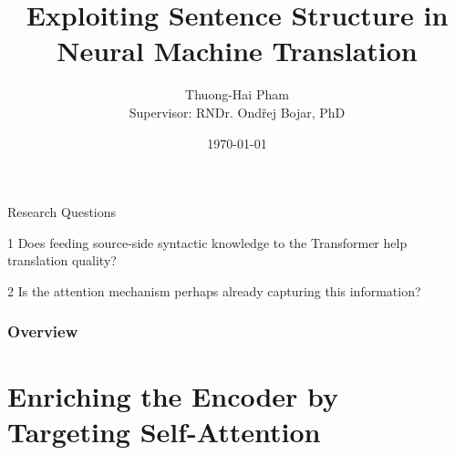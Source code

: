 \documentclass{beamer}
\title[Exploiting Sentence Structure in NMT]{Exploiting Sentence Structure in\\Neural Machine Translation} %
\author[Thuong-Hai Pham]{Thuong-Hai Pham\\
\medskip
\small{Supervisor: RNDr. Ond\v{r}ej Bojar, PhD}} %
\institute[UFAL] %
{
Institute of Formal and Applied Linguistics\\
Faculty of Mathematics and Physics\\
Charles University \\ %
\medskip
\textit{pham@ufal.mff.cuni.cz} %
}
\date{\today} %
\begin{document}
\begin{frame}
\titlepage %
\end{frame}


\begin{frame}{Research Questions}
\begin{block}
1 Does feeding source-side syntactic knowledge to the Transformer \citep{DBLP:conf/nips/VaswaniSPUJGKP17} help translation quality?
\end{block}
\begin{block}
2 Is the attention mechanism perhaps already capturing this information?
\end{block}
\end{frame}



\begin{frame}
\frametitle{Overview} %
\tableofcontents %
\end{frame}


\section{Enriching the Encoder by Targeting Self-Attention}
\end{document}
